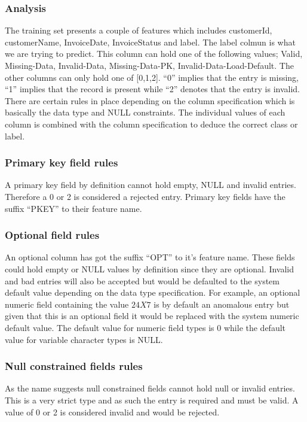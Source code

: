 \documentclass[12pt, letterpaper, titlepage]{report}
\begin{document}
\subsubsection{Analysis}

The training set presents a couple of features which includes customerId, customerName, InvoiceDate, InvoiceStatus and label. The label colmun is what we are trying to predict. This column can hold one of the following values; Valid, Missing-Data, Invalid-Data, Missing-Data-PK, Invalid-Data-Load-Default. The other columns can only hold one of [0,1,2]. “0” implies that the entry is missing, “1” implies that the record is present while “2” denotes that the entry is invalid. There are certain rules in place depending on the column specification which is basically the data type and NULL constraints.  The individual values of each column is combined with the column specification to deduce the correct class or label. 

\subsubsection*{Primary key field rules}
A primary key field by definition cannot hold empty, NULL and invalid entries. Therefore a 0 or 2 is considered a rejected entry. Primary key fields have the suffix “PKEY” to their feature name.

\subsubsection*{Optional field rules}
An optional column has got the suffix “OPT” to it’s feature name. These fields could hold empty or NULL values by definition since they are optional. Invalid and bad entries will also be accepted but would be defaulted to the system default value depending on the data type specification. For example, an optional numeric field containing the value $24X7$ is by default an anomalous entry but given that this is an optional field it would be replaced with the system numeric default value. The default value for numeric field types is 0 while the default value for variable character types is NULL.

\subsubsection*{Null constrained fields rules}
As the name suggests null constrained fields cannot hold null or invalid entries. This is a very strict type and as such the entry is required and must be valid. A value of 0 or 2 is considered invalid and would be rejected.
\end{document}

